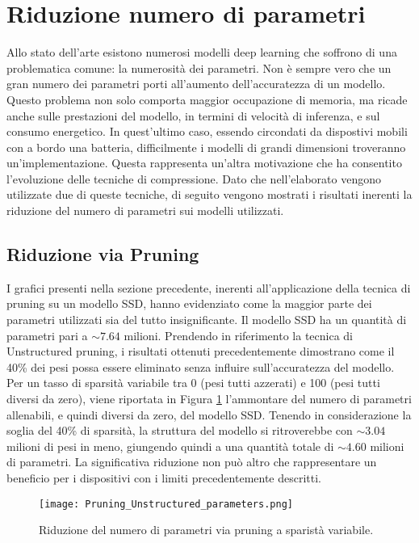\section{Riduzione numero di parametri}
Allo stato dell'arte esistono numerosi modelli deep learning che soffrono di una problematica comune: la numerosità dei parametri. Non è sempre vero che un gran numero dei parametri porti all'aumento dell'accuratezza di un modello. Questo problema non solo comporta maggior occupazione di memoria, ma ricade anche sulle prestazioni del modello, in termini di velocità di inferenza, e sul consumo energetico. In quest'ultimo caso, essendo circondati da dispostivi mobili con a bordo una batteria, difficilmente i modelli di grandi dimensioni troveranno un'implementazione. Questa rappresenta un'altra motivazione che ha consentito l'evoluzione delle tecniche di compressione. Dato che nell'elaborato vengono utilizzate due di queste tecniche, di seguito vengono mostrati i risultati inerenti la riduzione del numero di parametri sui modelli utilizzati.
\subsection{Riduzione via Pruning}
I grafici presenti nella sezione precedente, inerenti all'applicazione della tecnica di pruning su un modello SSD, hanno evidenziato come la maggior parte dei parametri utilizzati sia del tutto insignificante. Il modello SSD ha un quantità di parametri pari a $\sim{7.64}$ milioni. Prendendo in riferimento la tecnica di Unstructured pruning, i risultati ottenuti precedentemente dimostrano come il 40\% dei pesi possa essere eliminato senza influire sull'accuratezza del modello. Per un tasso di sparsità variabile tra 0 (pesi tutti azzerati) e 100 (pesi tutti diversi da zero), viene riportata in Figura \ref{par_pruning} l'ammontare del numero di parametri allenabili, e quindi diversi da zero, del modello SSD.
Tenendo in considerazione la soglia del 40\% di sparsità, la struttura del modello si ritroverebbe con $\sim{3.04}$ milioni di pesi in meno, giungendo quindi a una quantità totale di $\sim{4.60}$ milioni di parametri. La significativa riduzione non può altro che rappresentare un beneficio per i dispositivi con i limiti precedentemente descritti.
\begin{figure}
    \centering
    \texttt{[image: Pruning\_Unstructured\_parameters.png]}
    \centering
    \caption{Riduzione del numero di parametri via pruning a sparistà variabile.}
    \label{par_pruning}
\end{figure}
